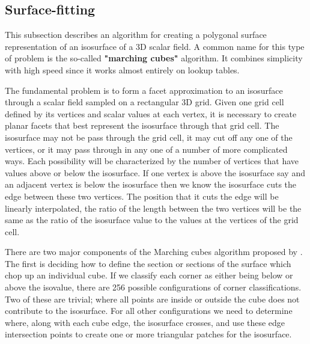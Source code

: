 \subsection{Surface-fitting}

This subsection describes an algorithm for creating a polygonal surface representation of an isosurface of a 3D scalar field. A common name for this type of problem is the so-called \textbf{ "marching cubes" } algorithm. It combines simplicity with high speed since it works almost entirely on lookup tables.

\par The fundamental problem is to form a facet approximation to an isosurface through a scalar field sampled on a rectangular 3D grid. Given one grid cell defined by its vertices and scalar values at each vertex, it is necessary to create planar facets that best represent the isosurface through that grid cell. The isosurface may not be pass through the grid cell, it may cut off any one of the vertices, or it may pass through in any one of a number of more complicated ways. Each possibility will be characterized by the number of vertices that have values above or below the isosurface. If one vertex is above the isosurface say and an adjacent vertex is below the isosurface then we know the isosurface cuts the edge between these two vertices. The position that it cuts the edge will be linearly interpolated, the ratio of the length between the two vertices will be the same as the ratio of the isosurface value to the values at the vertices of the grid cell.


There are two major components of the Marching cubes algorithm proposed by \cite{Lorensen:1987:MCA}. The first is deciding how to define the section or sections of the surface which chop up an individual cube. If we classify each corner as either being below or above the isovalue, there are 256 possible configurations of corner classifications. Two of these are trivial; where all points are inside or outside the cube does not contribute to the isosurface. For all other configurations we need to determine where, along with each cube edge, the isosurface crosses, and use these edge intersection points to create one or more triangular patches for the isosurface.


